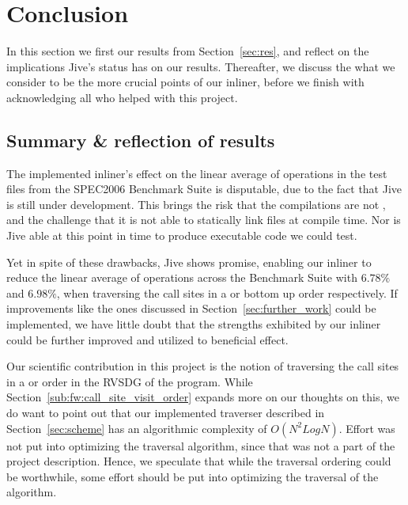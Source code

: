 
\clearpage
\section{Conclusion}
\label{sec:conclusion}

In this section we first  our results from
Section~\ref{sec:res}, and reflect on the implications Jive's status has on our
results. Thereafter, we discuss the what we consider to be the more crucial
points of our inliner, before we finish with acknowledging all who helped with
this project.

\subsection{Summary \& reflection of results}
\label{sub:conclusion:summary}

The implemented inliner's effect on the linear average of operations in the test
files from the SPEC2006 Benchmark Suite is disputable, due to the fact that Jive
is still under development. This brings the risk that the compilations are not
, and the challenge that it is not able to statically link
files at compile time. Nor is Jive able at this point in time to produce
executable code we could test.

Yet in spite of these drawbacks, Jive shows promise, enabling our inliner to
reduce the linear average of operations across the Benchmark Suite with $6.78\%$
and $6.98\%$, when traversing the call sites in a  or
bottom up order respectively. If improvements like the ones discussed in
Section~\ref{sec:further_work} could be implemented, we have little doubt that
the strengths exhibited by our inliner could be further improved and utilized to
beneficial effect.

Our scientific contribution in this project is the notion of traversing the call
sites in a  or  order in the RVSDG
of the program. While Section~\ref{sub:fw:call_site_visit_order} expands more on
our thoughts on this, we do want to point out that our implemented traverser
described in Section~\ref{sec:scheme} has an algorithmic complexity of $O(N^2
Log N)$. Effort was not put into optimizing the traversal algorithm, since that
was not a part of the project description. Hence, we speculate that while the
traversal ordering could be worthwhile, some effort should be put into optimizing the traversal of the algorithm.

